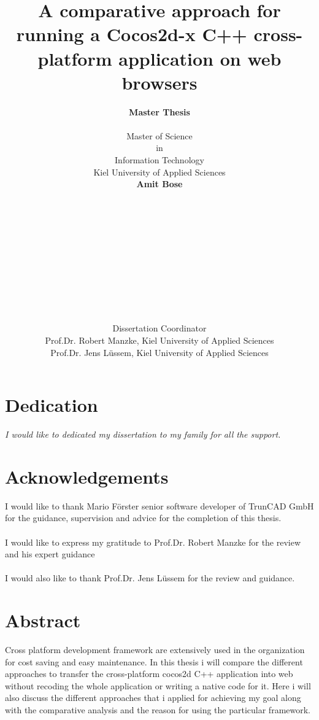 \documentclass[23pt]{article}
\title{A comparative approach for running a Cocos2d-x C++ cross- platform application on web browsers}
\author{ \textbf{Master Thesis } \\\\  Master of Science \\ in  \\ Information Technology\\  Kiel University of Applied Sciences  \\   \textbf{ Amit Bose }\\ \\ \\ \\ \\ \\ \\ \\ \\ \\ \\ \\  Dissertation Coordinator \\ Prof.Dr. Robert Manzke, Kiel University of Applied Sciences \\ Prof.Dr. Jens L\"{u}ssem, Kiel University of Applied Sciences }
\begin{document}
\maketitle
{}
\newpage
{}

\tableofcontents


\newpage

\setcounter{secnumdepth}{0}

\section{Dedication}

\textit{ \newline \newline I would like to dedicated my dissertation to  my family for all the support. }

\newpage

\section{Acknowledgements}

{\Large  I would like to thank Mario F\"{o}rster senior software developer of TrunCAD GmbH  for the  guidance, supervision and  advice for the completion of this thesis.\\  \\ I would  like to express my gratitude to  Prof.Dr. Robert Manzke for the review and his expert guidance 
 \\ \\  I would also like to thank Prof.Dr. Jens L\"{u}ssem for the review and guidance. \par}

\newpage

\section{Abstract}

{\Large Cross platform development framework are extensively used in the organization for cost saving and easy maintenance. In this thesis i will compare the different approaches to transfer the cross-platform cocos2d C++  application into web without recoding the whole application or writing a native code for it. Here i will also discuss the different approaches that i applied for achieving my goal along with the comparative analysis and the reason for using the particular framework.
\par}
\end{document}

